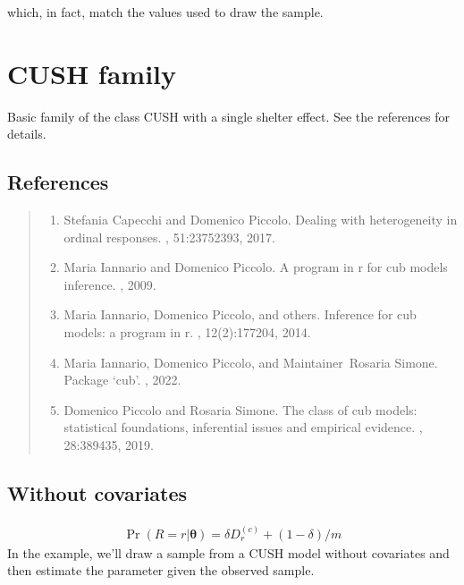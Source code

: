 \documentclass[letterpaper,10pt,english]{sphinxmanual}
\begin{document}
\sphinxAtStartPar
which, in fact, match the values used to draw the sample.


\section{CUSH family}
\label{\detokenize{manual:cush-family}}
\sphinxAtStartPar
Basic family of the class CUSH with a single shelter effect.
See the references for details.


\subsection{References}
\label{\detokenize{manual:id78}}\begin{quote}
\begin{enumerate}
%
\setcounter{enumi}{0}
\item {} 
\sphinxAtStartPar
Stefania Capecchi and Domenico Piccolo. Dealing with heterogeneity in ordinal responses. , 51:2375\textendash{}2393, 2017.

\item {} 
\sphinxAtStartPar
Maria Iannario and Domenico Piccolo. A program in r for cub models inference. , 2009.

\item {} 
\sphinxAtStartPar
Maria Iannario, Domenico Piccolo, and others. Inference for cub models: a program in r. , 12(2):177\textendash{}204, 2014.

\item {} 
\sphinxAtStartPar
Maria Iannario, Domenico Piccolo, and Maintainer Rosaria Simone. Package ‘cub’. , 2022.

\item {} 
\sphinxAtStartPar
Domenico Piccolo and Rosaria Simone. The class of cub models: statistical foundations, inferential issues and empirical evidence. , 28:389\textendash{}435, 2019.

\end{enumerate}
\end{quote}


\subsection{Without covariates}
\label{\detokenize{manual:cush-without-covariates}}\label{\detokenize{manual:id116}}
\sphinxAtStartPar
{}
\begin{equation*}
\begin{split}\Pr(R=r|\pmb\theta) = \delta D_r^{(c)} + (1-\delta)/m\end{split}
\end{equation*}
\sphinxAtStartPar
In the example, we’ll draw a sample from a CUSH model without covariates and
then estimate the parameter given the observed sample.
\end{document}
